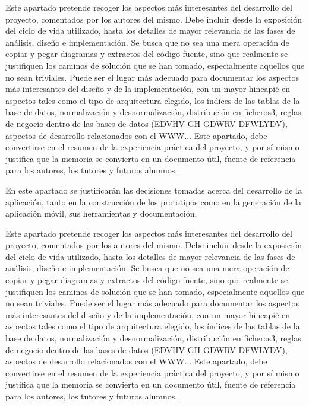 
Este apartado pretende recoger los aspectos más interesantes del desarrollo del proyecto, comentados por los autores del mismo.
Debe incluir desde la exposición del ciclo de vida utilizado, hasta los detalles de mayor relevancia de las fases de análisis, diseño e implementación.
Se busca que no sea una mera operación de copiar y pegar diagramas y extractos del código fuente, sino que realmente se justifiquen los caminos de solución que se han tomado, especialmente aquellos que no sean triviales.
Puede ser el lugar más adecuado para documentar los aspectos más interesantes del diseño y de la implementación, con un mayor hincapié en aspectos tales como el tipo de arquitectura elegido, los índices de las tablas de la base de datos, normalización y desnormalización, distribución en ficheros3, reglas de negocio dentro de las bases de datos (EDVHV GH GDWRV DFWLYDV), aspectos de desarrollo relacionados con el WWW...
Este apartado, debe convertirse en el resumen de la experiencia práctica del proyecto, y por sí mismo justifica que la memoria se convierta en un documento útil, fuente de referencia para los autores, los tutores y futuros alumnos.



En este apartado se justificarán las decisiones tomadas acerca del desarrollo de la aplicación, tanto en la construcción de los prototipos como en la generación de la aplicación móvil, sus herramientas y documentación.

Este apartado pretende recoger los aspectos más interesantes del desarrollo del proyecto, comentados por los autores del mismo.
Debe incluir desde la exposición del ciclo de vida utilizado, hasta los detalles de mayor relevancia de las fases de análisis, diseño e implementación.
Se busca que no sea una mera operación de copiar y pegar diagramas y extractos del código fuente, sino que realmente se justifiquen los caminos de solución que se han tomado, especialmente aquellos que no sean triviales.
Puede ser el lugar más adecuado para documentar los aspectos más interesantes del diseño y de la implementación, con un mayor hincapié en aspectos tales como el tipo de arquitectura elegido, los índices de las tablas de la base de datos, normalización y desnormalización, distribución en ficheros3, reglas de negocio dentro de las bases de datos (EDVHV GH GDWRV DFWLYDV), aspectos de desarrollo relacionados con el WWW...
Este apartado, debe convertirse en el resumen de la experiencia práctica del proyecto, y por sí mismo justifica que la memoria se convierta en un documento útil, fuente de referencia para los autores, los tutores y futuros alumnos.


